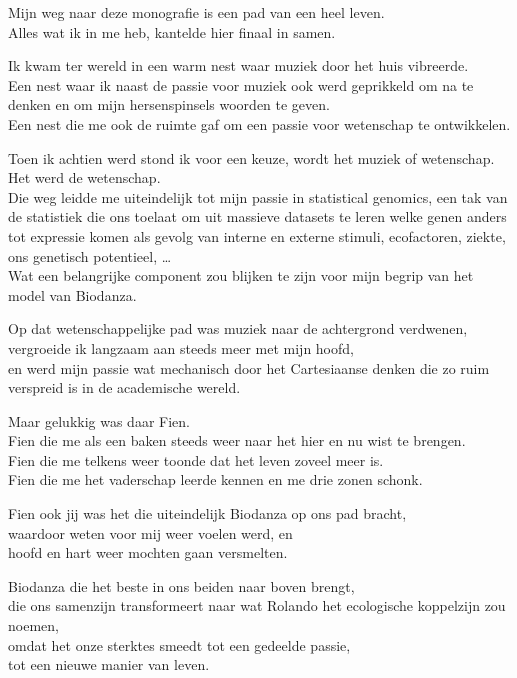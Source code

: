 \documentclass[
  11pt,
]{book}
\begin{document}
Mijn weg naar deze monografie is een pad van een heel leven.\\
Alles wat ik in me heb, kantelde hier finaal in samen.

Ik kwam ter wereld in een warm nest waar muziek door het huis vibreerde.\\
Een nest waar ik naast de passie voor muziek ook werd geprikkeld om na te denken en om mijn hersenspinsels woorden te geven.\\
Een nest die me ook de ruimte gaf om een passie voor wetenschap te ontwikkelen.

Toen ik achtien werd stond ik voor een keuze, wordt het muziek of wetenschap.\\
Het werd de wetenschap.\\
Die weg leidde me uiteindelijk tot mijn passie in statistical genomics, een tak van de statistiek die ons toelaat om uit massieve datasets te leren welke genen anders tot expressie komen als gevolg van interne en externe stimuli, ecofactoren, ziekte, ons genetisch potentieel, \ldots{}\\
Wat een belangrijke component zou blijken te zijn voor mijn begrip van het model van Biodanza.

Op dat wetenschappelijke pad was muziek naar de achtergrond verdwenen,\\
vergroeide ik langzaam aan steeds meer met mijn hoofd,\\
en werd mijn passie wat mechanisch door het Cartesiaanse denken die zo ruim verspreid is in de academische wereld.

Maar gelukkig was daar Fien.\\
Fien die me als een baken steeds weer naar het hier en nu wist te brengen.\\
Fien die me telkens weer toonde dat het leven zoveel meer is.\\
Fien die me het vaderschap leerde kennen en me drie zonen schonk.

Fien ook jij was het die uiteindelijk Biodanza op ons pad bracht,\\
waardoor weten voor mij weer voelen werd, en\\
hoofd en hart weer mochten gaan versmelten.

Biodanza die het beste in ons beiden naar boven brengt,\\
die ons samenzijn transformeert naar wat Rolando
het ecologische koppelzijn zou noemen,\\
omdat het onze sterktes smeedt tot een gedeelde passie,\\
tot een nieuwe manier van leven.
\end{document}
